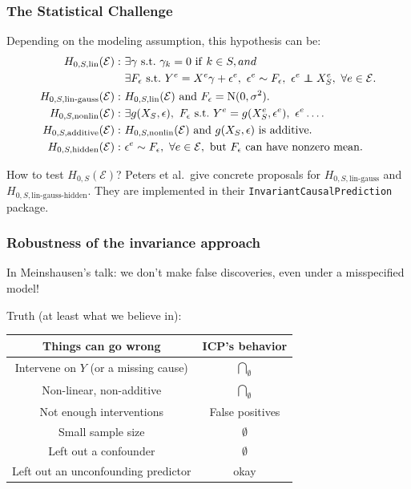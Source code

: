 \documentclass{beamer}
\newcommand\independent{\protect\mathpalette{\protect\independenT}{\perp}}
\def\independenT#1#2{\mathrel{\rlap{$#1#2$}\mkern2mu{#1#2}}}
\begin{document}
\begin{frame}
  \frametitle{The Statistical Challenge}
  Depending on the modeling assumption, this hypothesis can be:
\[
\begin{split}
    H_{0,S,\mathrm{lin}}(\mathcal{E}):~&\exists \gamma \mathrm{~s.t.~} \gamma_k =
    0~\mathrm{if}~k \in S, and \\ ~&
    \exists F_{\epsilon} \mathrm{~s.t.~} Y^e = X^e \gamma +
    \epsilon^e,~\epsilon^e \sim F_{\epsilon},~ \epsilon^e \independent
    X^e_{S},~\forall e \in \mathcal{E}. \\
    H_{0,S,\mathrm{lin\textrm{-}gauss}}(\mathcal{E}):~&
    H_{0,S,\mathrm{lin}}(\mathcal{E}) \mathrm{~and~} F_{\epsilon} = \mathrm{N}(0,\sigma^2). \\
    H_{0,S,\mathrm{nonlin}}(\mathcal{E}):~&\exists g(X_S,\epsilon),~F_{\epsilon} \mathrm{~s.t.~}
    Y^e = g(X_S^e, \epsilon^e),~\epsilon^e\ldots.\\
    H_{0,S,\mathrm{additive}}(\mathcal{E}):~&H_{0,S,\mathrm{nonlin}}(\mathcal{E})
    \mathrm{~and~} g(X_S,\epsilon) \mathrm{~is~additive}.\\
    H_{0,S,\mathrm{hidden}}(\mathcal{E}):~&\epsilon^e \sim
    F_{\epsilon}, ~ \forall e \in
    \mathcal{E},~\mathrm{but}~F_{\epsilon}\mathrm{~can~have~nonzero~mean}.\\
\end{split}
\]

  \begin{exampleblock}{How to test $H_{0,S}(\mathcal{E})$?}
  Peters et al.\ give concrete proposals for $H_{0,S,\mathrm{lin\textrm{-}gauss}}$ and
  $H_{0,S,\mathrm{lin\textrm{-}gauss\textrm{-}hidden}}$. They are implemented in their
  \texttt{InvariantCausalPrediction} package.
  \end{exampleblock}

\end{frame}

\begin{frame}
  \frametitle{Robustness of the invariance approach}
  In Meinshausen's talk: we don't make false discoveries, even under a
  misspecified model!

  Truth (at least what we believe in):

  \begin{center}
  \begin{tabular}{|c|c|}
    \hline
    Things can go wrong & ICP's behavior \\
    \hline
    Intervene on $Y$ (or a missing cause) &
    $\underset{\emptyset}{\bigcap}$ \\
    \hline
    Non-linear, non-additive &
    $\underset{\emptyset}{\bigcap}$ \\
    \hline
    Not enough interventions &
    False positives \\
    \hline
    Small sample size &
    $\emptyset$ \\
    \hline
    Left out a confounder & $\emptyset$ \\
    \hline
    Left out an unconfounding predictor & okay \\
    \hline
  \end{tabular}
  \end{center}
\end{frame}
\end{document}
